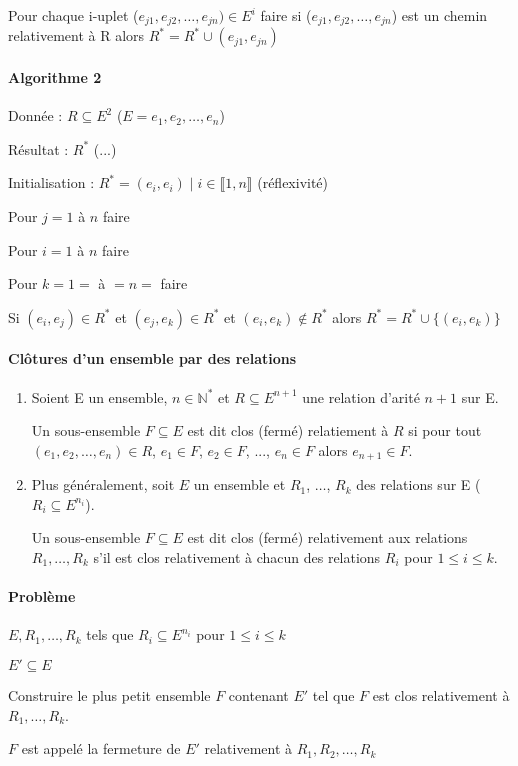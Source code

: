 \documentclass[12pt, a4paper]{report}
\begin{document}
  Pour chaque i-uplet ($e_{j1}, e_{j2}, \dots, e_{jn}) \in E^i$ faire
     si ($e_{j1}, e_{j2}, \dots, e_{jn}$) est un chemin relativement à R alors
     $R^{*} = R^{*} \cup { (e_{j1}, e_{jn})}$


\paragraph{Algorithme 2}

Donnée : $R \subseteq E^{2}$ ($ E = {e_1, e_2, \dots, e_n}$)

Résultat : $R^{*}$ (...)

Initialisation : $R^{*} = {(e_i,e_i)\mid i\in \llbracket 1,n\rrbracket}$ (réflexivité)

Pour $j = 1$ à $n$ faire

  Pour $i = 1$ à $n$ faire

    Pour $k = 1=$ à $=n=$ faire

      Si $(e_i, e_j)\in R^{*}$ et $(e_j, e_k)\in R^{*}$ et $(e_i,e_k) \not\in R^{*}$
      alors $R^{*} = R^{*}\cup \{(e_i,e_k)\}$


\paragraph{Clôtures d'un ensemble par des relations}

\begin{enumerate}
  \item Soient E un ensemble, $n \in \mathbb{N}^{*}$ et $R \subseteq E^{n+1}$
  une relation d'arité $n+1$ sur E.
  
  Un sous-ensemble $F \subseteq E$ est dit clos (fermé) relatiement à $R$ si pour
  tout $(e_1, e_2, \dots, e_n) \in R$, $e_1 \in F$, $e_2 \in F$, ..., $e_n \in F$
  alors $e_{n+1} \in F$.

  \item Plus généralement, soit $E$ un ensemble et $R_1$, $\dots$, $R_k$ des relations
  sur E ($R_i \subseteq E^{n_i}$).

  Un sous-ensemble $F \subseteq E$ est dit clos (fermé) relativement aux relations 
  $R_1, \dots, R_k$ s'il est clos relativement à chacun des relations $R_i$ pour
  $1 \leq i \leq k$.
\end{enumerate}


\paragraph{Problème}

$E, R_1, \dots, R_k$ tels que $R_i \subseteq E^{n_i}$ pour $1 \leq i \leq k$

$E' \subseteq E$

Construire le plus petit ensemble $F$ contenant $E'$ tel que $F$ est clos
relativement à $R_1, \dots, R_k$.

$F$ est appelé la fermeture de $E'$ relativement à $R_1, R_2, \dots, R_k$
\end{document}

